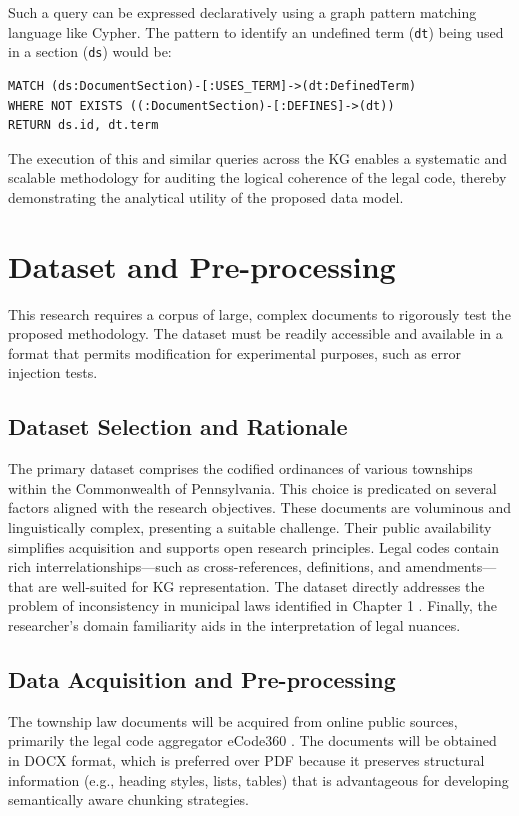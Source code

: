 Such a query can be expressed declaratively using a graph pattern matching language like Cypher. The pattern to identify an undefined term (\texttt{dt}) being used in a section (\texttt{ds}) would be:
\begin{verbatim}
MATCH (ds:DocumentSection)-[:USES_TERM]->(dt:DefinedTerm)
WHERE NOT EXISTS ((:DocumentSection)-[:DEFINES]->(dt))
RETURN ds.id, dt.term
\end{verbatim}
The execution of this and similar queries across the KG enables a systematic and scalable methodology for auditing the logical coherence of the legal code, thereby demonstrating the analytical utility of the proposed data model.

\section{Dataset and Pre-processing}
This research requires a corpus of large, complex documents to rigorously test the proposed methodology. The dataset must be readily accessible and available in a format that permits modification for experimental purposes, such as error injection tests. 

\subsection{Dataset Selection and Rationale}
The primary dataset comprises the codified ordinances of various townships within the Commonwealth of Pennsylvania. This choice is predicated on several factors aligned with the research objectives. These documents are voluminous and linguistically complex, presenting a suitable challenge. Their public availability simplifies acquisition and supports open research principles. Legal codes contain rich interrelationships—such as cross-references, definitions, and amendments—that are well-suited for KG representation. The dataset directly addresses the problem of inconsistency in municipal laws identified in Chapter 1 \parencite{RefWorks:RefID:144-curley2024municipal, RefWorks:RefID:145-rau2024municipal}. Finally, the researcher’s domain familiarity aids in the interpretation of legal nuances.

\subsection{Data Acquisition and Pre-processing}
The township law documents will be acquired from online public sources, primarily the legal code aggregator eCode360 \parencite{RefWorks:RefID:146-sanders2024municipal}. The documents will be obtained in DOCX format, which is preferred over PDF because it preserves structural information (e.g., heading styles, lists, tables) that is advantageous for developing semantically aware chunking strategies. 

